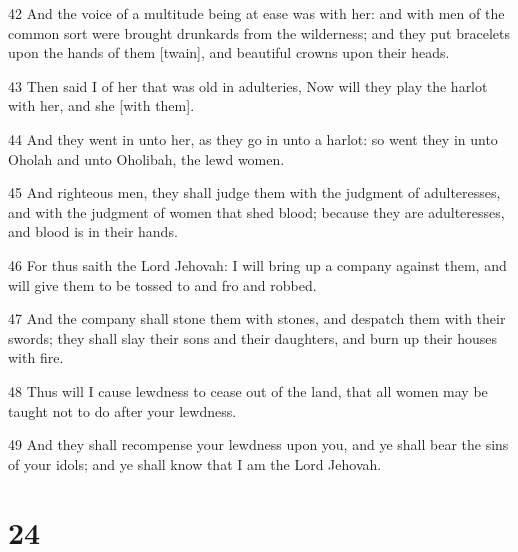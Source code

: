 \par 42 And the voice of a multitude being at ease was with her: and with men of the common sort were brought drunkards from the wilderness; and they put bracelets upon the hands of them [twain], and beautiful crowns upon their heads.
\par 43 Then said I of her that was old in adulteries, Now will they play the harlot with her, and she [with them].
\par 44 And they went in unto her, as they go in unto a harlot: so went they in unto Oholah and unto Oholibah, the lewd women.
\par 45 And righteous men, they shall judge them with the judgment of adulteresses, and with the judgment of women that shed blood; because they are adulteresses, and blood is in their hands.
\par 46 For thus saith the Lord Jehovah: I will bring up a company against them, and will give them to be tossed to and fro and robbed.
\par 47 And the company shall stone them with stones, and despatch them with their swords; they shall slay their sons and their daughters, and burn up their houses with fire.
\par 48 Thus will I cause lewdness to cease out of the land, that all women may be taught not to do after your lewdness.
\par 49 And they shall recompense your lewdness upon you, and ye shall bear the sins of your idols; and ye shall know that I am the Lord Jehovah.

\chapter{24}

